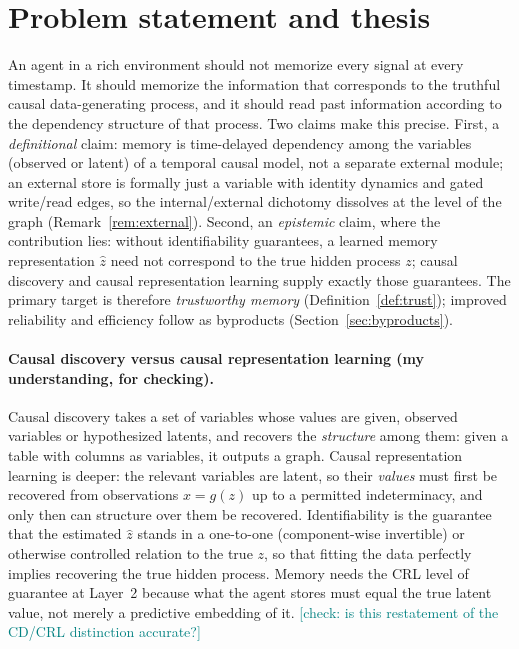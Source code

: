 \documentclass[11pt]{article}
\newcommand{\checkY}[1]{\textcolor{teal}{\footnotesize [check: #1]}}
\theoremstyle{plain}
\theoremstyle{definition}
\begin{document}
\section{Problem statement and thesis}\label{sec:thesis}

An agent in a rich environment should not memorize every signal at every timestamp. It should memorize the information that corresponds to the truthful causal data-generating process, and it should read past information according to the dependency structure of that process. Two claims make this precise. First, a \emph{definitional} claim: memory is time-delayed dependency among the variables (observed or latent) of a temporal causal model, not a separate external module; an external store is formally just a variable with identity dynamics and gated write/read edges, so the internal/external dichotomy dissolves at the level of the graph (Remark~\ref{rem:external}). Second, an \emph{epistemic} claim, where the contribution lies: without identifiability guarantees, a learned memory representation $\hat z$ need not correspond to the true hidden process $z$; causal discovery and causal representation learning supply exactly those guarantees. The primary target is therefore \emph{trustworthy memory} (Definition~\ref{def:trust}); improved reliability and efficiency follow as byproducts (Section~\ref{sec:byproducts}).

\paragraph{Causal discovery versus causal representation learning (my understanding, for checking).}
Causal discovery takes a set of variables whose values are given, observed variables or hypothesized latents, and recovers the \emph{structure} among them: given a table with columns as variables, it outputs a graph. Causal representation learning is deeper: the relevant variables are latent, so their \emph{values} must first be recovered from observations $x = g(z)$ up to a permitted indeterminacy, and only then can structure over them be recovered. Identifiability is the guarantee that the estimated $\hat z$ stands in a one-to-one (component-wise invertible) or otherwise controlled relation to the true $z$, so that fitting the data perfectly implies recovering the true hidden process. Memory needs the CRL level of guarantee at Layer~2 because what the agent stores must equal the true latent value, not merely a predictive embedding of it. \checkY{is this restatement of the CD/CRL distinction accurate?}
\end{document}
